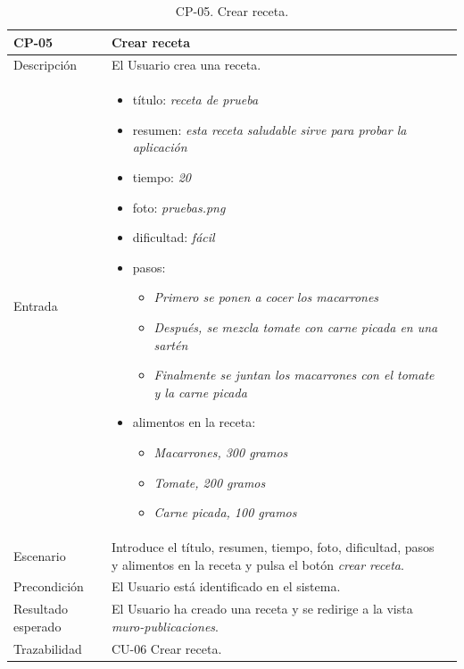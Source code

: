    \begin{table}[H]
        \centering
        \begin{tabularx}{1\textwidth} { 
            | >{\raggedright\arraybackslash}X 
            | >{\raggedright\arraybackslash}X 
            | >{\raggedright\arraybackslash}X 
            |  }
        \hline
        \textbf{CP-05}     & \textbf{Crear receta}                             \\ \hline
        Descripción        & El Usuario crea una receta.      \\ \hline
        Entrada            & \begin{itemize}
            \item título: \textit{receta de prueba}
            \item resumen: \textit{esta receta saludable sirve para probar la aplicación}
            \item tiempo: \textit{20}
            \item foto: \textit{pruebas.png}
            \item dificultad: \textit{fácil}
            \item pasos:
            \begin{itemize}
                \item \textit{Primero se ponen a cocer los macarrones}
                \item \textit{Después, se mezcla tomate con carne picada en una sartén}
                \item \textit{Finalmente se juntan los macarrones con el tomate y la carne picada}
            \end{itemize}
            \item alimentos en la receta:
            \begin{itemize}
                \item \textit{Macarrones, 300 gramos}
                \item \textit{Tomate, 200 gramos}
                \item \textit{Carne picada, 100 gramos}
            \end{itemize}
        \end{itemize} \\ \hline
        Escenario          & Introduce el título, resumen, tiempo, foto, dificultad, pasos y alimentos en la receta y pulsa el botón \textit{crear receta}.                           \\ \hline
        Precondición          & El Usuario está identificado en el sistema.                             \\ \hline
      
        Resultado esperado & El Usuario ha creado una receta y se redirige a la vista \textit{muro-publicaciones}. \\ \hline
        Trazabilidad & CU-06 Crear receta. \\ \hline
    \end{tabularx}
    \caption{CP-05. Crear receta.}
    \label{table:CP-05}
        \end{table}


